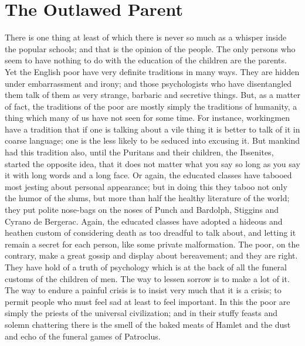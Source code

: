 \documentclass{book}
\begin{document}
\chapter{The Outlawed Parent}
\label{chapter-44}
There is one thing at least of which there is never so much as a whisper inside the popular schools; and that is the opinion of the people. The only persons who seem to have nothing to do with the education of the children are the parents. Yet the English poor have very definite traditions in many ways. They are hidden under embarrassment and irony; and those psychologists who have disentangled them talk of them as very strange, barbaric and secretive things. But, as a matter of fact, the traditions of the poor are mostly simply the traditions of humanity, a thing which many of us have not seen for some time. For instance, workingmen have a tradition that if one is talking about a vile thing it is better to talk of it in coarse language; one is the less likely to be seduced into excusing it. But mankind had this tradition also, until the Puritans and their children, the Ibsenites, started the opposite idea, that it does not matter what you say so long as you say it with long words and a long face. Or again, the educated classes have tabooed most jesting about personal appearance; but in doing this they taboo not only the humor of the slums, but more than half the healthy literature of the world; they put polite nose-bags on the noses of Punch and Bardolph, Stiggins and Cyrano de Bergerac. Again, the educated classes have adopted a hideous and heathen custom of considering death as too dreadful to talk about, and letting it remain a secret for each person, like some private malformation. The poor, on the contrary, make a great gossip and display about bereavement; and they are right. They have hold of a truth of psychology which is at the back of all the funeral customs of the children of men. The way to lessen sorrow is to make a lot of it. The way to endure a painful crisis is to insist very much that it is a crisis; to permit people who must feel sad at least to feel important. In this the poor are simply the priests of the universal civilization; and in their stuffy feasts and solemn chattering there is the smell of the baked meats of Hamlet and the dust and echo of the funeral games of Patroclus.
\end{document}
